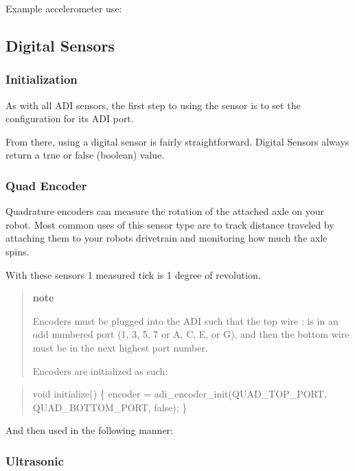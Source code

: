 Example accelerometer use\+:

\subsection*{Digital Sensors}

\subsubsection*{Initialization}

As with all A\+DI sensors, the first step to using the sensor is to set the configuration for its A\+DI port.

From there, using a digital sensor is fairly straightforward. Digital Sensors always return a true or false (boolean) value.

\subsubsection*{Quad Encoder}

Quadrature encoders can measure the rotation of the attached axle on your robot. Most common uses of this sensor type are to track distance traveled by attaching them to your robots drivetrain and monitoring how much the axle spins.

With these sensors 1 measured tick is 1 degree of revolution.

\begin{quote}
{\bfseries note}

Encoders must be plugged into the A\+DI such that the top wire \+: is in an odd numbered port (1, 3, 5, 7 or \textquotesingle{}A\textquotesingle{}, \textquotesingle{}C\textquotesingle{}, \textquotesingle{}E\textquotesingle{}, or \textquotesingle{}G\textquotesingle{}), and then the bottom wire must be in the next highest port number.

Encoders are initialized as such\+: \end{quote}


\begin{quote}

\begin{DoxyCode}
void initialize() \{
  encoder = adi\_encoder\_init(QUAD\_TOP\_PORT, QUAD\_BOTTOM\_PORT, false);
\}
\end{DoxyCode}
 \end{quote}


And then used in the following manner\+:

\subsubsection*{Ultrasonic}

